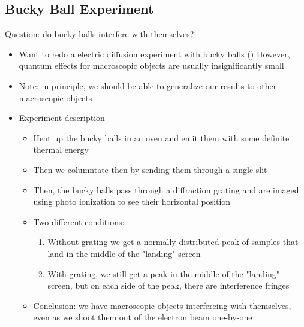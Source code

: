 \documentclass[a4paper]{article}
\begin{document}
\subsection*{Bucky  Ball Experiment}
Question: do bucky balls interfere with themselves? 
\begin{itemize}
    \item Want to redo a electric diffusion experiment with bucky balls ()
    \itme However, quantum effects for macroscopic objects are usually insignificantly small
    \item Note: in principle, we should be able to generalize our results to other macroscopic objects 
    \item Experiment description
    \begin{itemize}
        \item Heat up the bucky balls in an oven and emit them with some definite thermal energy 
        \item Then we columntate then by sending them through a single slit 
        \item Then, the bucky balls pass through a diffraction grating and are imaged using photo ionization to see their horizontal position 
        \item Two different conditions:
        \begin{enumerate}
            \item Without grating we get a normally distributed peak of samples that land in the middle of the "landing" screen
            \item With grating, we still get a peak in the middle of the "landing" screen, but on each side of the peak, there are interference fringes 
        \end{enumerate}
        \item Conclusion: we have macroscopic objects interfereing with themselves, even as we shoot them out of the electron beam one-by-one
    \end{itemize}
\end{itemize}
\end{document}
